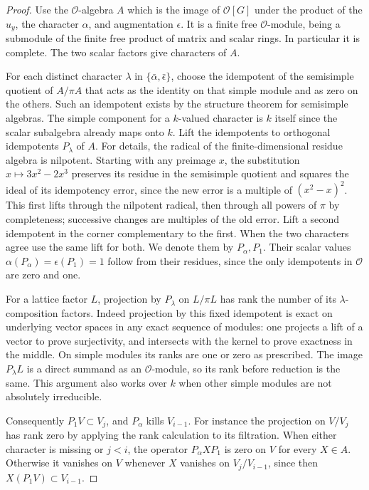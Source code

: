 \documentclass[a4paper,11pt]{article}
\theoremstyle{definition}
\theoremstyle{remark}
\numberwithin{equation}{section}
\begin{document}
\begin{proof}
Use the \(\mathcal O\)-algebra \(A\) which is the image of
\(\mathcal O[G]\) under the product of the \(u_y\), the
character \(\alpha\), and augmentation \(\epsilon\). It is a
finite free \(\mathcal O\)-module, being a submodule of the
finite free product of matrix and scalar rings. In particular
it is complete. The two scalar factors give characters of \(A\).

For each distinct character \(\lambda\) in
\(\{\bar\alpha,\bar\epsilon\}\), choose the idempotent of the
semisimple quotient of \(A/\pi A\) that acts as the identity
on that simple module and as zero on the others. Such an
idempotent exists by the structure theorem for semisimple
algebras. The simple component for a \(k\)-valued character is
\(k\) itself since the scalar subalgebra already maps onto
\(k\). Lift the idempotents to orthogonal idempotents \(P_\lambda\)
of \(A\). For details, the radical of the finite-dimensional
residue algebra is nilpotent. Starting with any preimage \(x\),
the substitution \(x\mapsto 3x^2-2x^3\) preserves its residue
in the semisimple quotient and squares the ideal of its
idempotency error, since the new error is a multiple of
\((x^2-x)^2\). This first lifts through the nilpotent radical,
then through all powers of \(\pi\) by completeness; successive
changes are multiples of the old error. Lift a second idempotent
in the corner complementary to the first. When the two
characters agree use the same lift for both. We denote them by
\(P_\alpha,P_1\). Their scalar values
\(\alpha(P_\alpha)=\epsilon(P_1)=1\) follow from their residues,
since the only idempotents in \(\mathcal O\) are zero and one.

For a lattice factor \(L\), projection by \(P_\lambda\) on
\(L/\pi L\) has rank the number of its \(\lambda\)-composition
factors. Indeed projection by this fixed idempotent is exact
on underlying vector spaces in any exact sequence of modules:
one projects a lift of a vector to prove surjectivity, and
intersects with the kernel to prove exactness in the middle.
On simple modules its ranks are one or zero as prescribed.
The image \(P_\lambda L\) is a direct summand as an
\(\mathcal O\)-module, so its rank before reduction is the same.
This argument also works over \(k\) when other simple modules
are not absolutely irreducible.

Consequently \(P_1V\subset V_j\), and \(P_\alpha\) kills
\(V_{i-1}\). For instance the projection on \(V/V_j\) has
rank zero by applying the rank calculation to its filtration.
When either character is missing or \(j<i\), the operator
\(P_\alpha X P_1\) is zero on \(V\) for every \(X\in A\).
Otherwise it vanishes on \(V\) whenever \(X\) vanishes on
\(V_j/V_{i-1}\), since then \(X(P_1V)\subset V_{i-1}\).


\end{proof}
\end{document}
